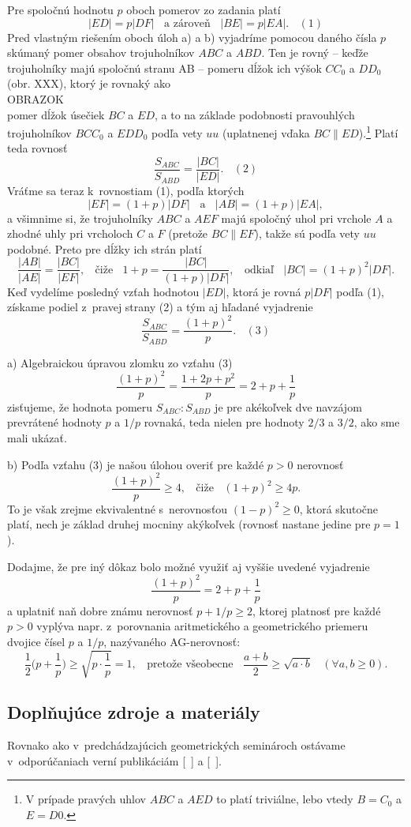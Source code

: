 \rieh Pre spoločnú hodnotu $p$ oboch pomerov zo zadania platí
$$|ED| = p|DF| \ \ \ \ \text{a zároveň} \ \ \ \ |BE| = p|EA|.  \ \ \ \ (1)$$
Pred vlastným riešením oboch úloh a) a b) vyjadríme pomocou daného čísla $p$ skúmaný pomer obsahov trojuholníkov $ABC$ a $ABD$. Ten je rovný -- keďže trojuholníky majú spoločnú stranu AB -- pomeru dĺžok ich výšok $CC_0$ a $DD_0$ (obr. XXX), ktorý je rovnaký ako
\\
OBRAZOK
\\
pomer dĺžok úsečiek $BC$ a $ED$, a to na základe podobnosti pravouhlých trojuholníkov $BCC_0$ a $EDD_0$ podľa vety $uu$ (uplatnenej vďaka $BC \parallel ED$).\footnote{V prípade pravých uhlov $ABC$ a $AED$ to platí triviálne, lebo vtedy $B = C_0$ a $E = D0$.} Platí teda rovnosť
$$\frac{S_{ABC}}{S_{ABD}} =\frac{|BC|}{|ED|}.\ \ \ \  (2)$$
Vráťme sa teraz k~rovnostiam (1), podľa ktorých
$$|EF| = (1 + p)|DF| \ \ \ \ \text{a} \ \ \ \ |AB| = (1 + p)|EA|,$$
a všimnime si, že trojuholníky $ABC$ a $AEF$ majú spoločný uhol pri vrchole $A$ a zhodné uhly pri vrcholoch $C$ a $F$ (pretože $BC \parallel EF$), takže sú podľa vety $uu$ podobné. Preto
pre dĺžky ich strán platí
$$\frac{|AB|}{|AE|}=\frac{|BC|}{|EF|},\ \ \ \ \text{čiže} \ \ \ \  1 + p =\frac{|BC|}{(1 + p)|DF|}, \ \ \ \ \text{odkiaľ} \ \ \ \ |BC| = (1 + p)^2 |DF|.$$
Keď vydelíme posledný vzťah hodnotou $|ED|$, ktorá je rovná $p|DF|$ podľa (1), získame podiel z~pravej strany (2) a tým aj hľadané vyjadrenie
$$\frac{S_{ABC}}{S_{ABD}}=\frac{(1 + p)^2}{p}. \ \ \ \  (3)$$

a) Algebraickou úpravou zlomku zo vzťahu (3)
$$ \frac{(1 + p)^2}{p}=\frac{1 + 2p + p^2}{p}= 2 + p + \frac{1}{p}$$
zisťujeme, že hodnota pomeru $S_{ABC} : S_{ABD}$ je pre akékoľvek dve navzájom prevrátené hodnoty $p$ a $1/p$ rovnaká, teda nielen pre hodnoty $2/3$ a $3/2$, ako sme mali ukázať.

b) Podľa vzťahu (3) je našou úlohou overiť pre každé $p > 0$ nerovnosť
$$\frac{(1 + p)^2}{p}\geq4,\ \ \ \ \text{čiže} \ \ \ \  (1 + p)^2\geq 4p.$$
To je však zrejme ekvivalentné s~nerovnosťou $(1 -p)^2\geq 0$, ktorá skutočne platí, nech je základ druhej mocniny akýkoľvek (rovnosť nastane jedine pre $p = 1$).

Dodajme, že pre iný dôkaz bolo možné využiť aj vyššie uvedené  vyjadrenie
$$\frac{(1 + p)^2}{p}= 2 + p +\frac{1}{p}$$
a uplatniť naň dobre známu nerovnosť $p + 1/p \geq 2$, ktorej platnosť pre každé $p > 0$ vyplýva napr. z~porovnania aritmetického a geometrického priemeru dvojice čísel $p$ a $1/p$, nazývaného AG-nerovnosť:
$$\frac{1}{2}\bigg(p +\frac{1}{p}\bigg)\geq \sqrt{p\cdot \frac{1}{p}}= 1, \ \ \ \ \text{pretože všeobecne} \ \ \ \ \frac{a+b}{2} \geq \sqrt{a\cdot b} \ \ \ \ (\forall a, b \geq 0).$$

\subsection*{Doplňujúce zdroje a materiály}
Rovnako ako v~predchádzajúcich geometrických seminároch ostávame v~odporúčaniach verní publikáciám [~\cite{andreescu2013}] a [~\cite{kadlecek1996}].

